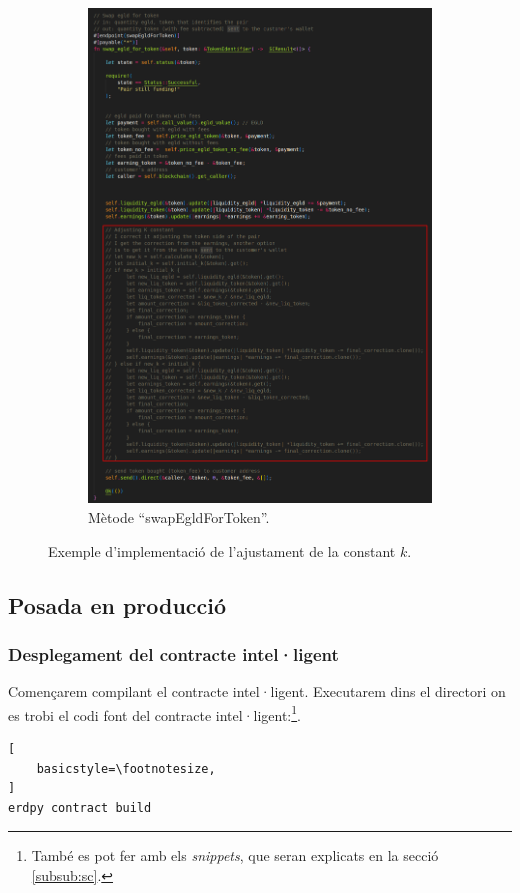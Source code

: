\documentclass[11pt,a4paper]{article}
\begin{document}
\begin{figure}[!htb]
\begin{subfigure}[b]{0.47\textwidth}
  \includegraphics[width=\linewidth]{imp-sc02.png}
  \caption{Mètode ``swapEgldForToken''.}\label{fig:impsc02}
\end{subfigure}\hfill
\caption{Exemple d'implementació de l'ajustament de la constant \(k\).}
\label{fig:impcorrectk}
\end{figure}

\subsection{Posada en producció}
\subsubsection{Desplegament del contracte intel·ligent}
Començarem compilant el contracte intel·ligent. Executarem dins el directori on es trobi el codi font del contracte intel·ligent:\footnote{També es pot fer amb els \textit{snippets}, que seran explicats en la secció \ref{subsub:sc}.}.
\begin{lstlisting}[
    basicstyle=\footnotesize,
]
erdpy contract build
\end{lstlisting}
\end{document}
